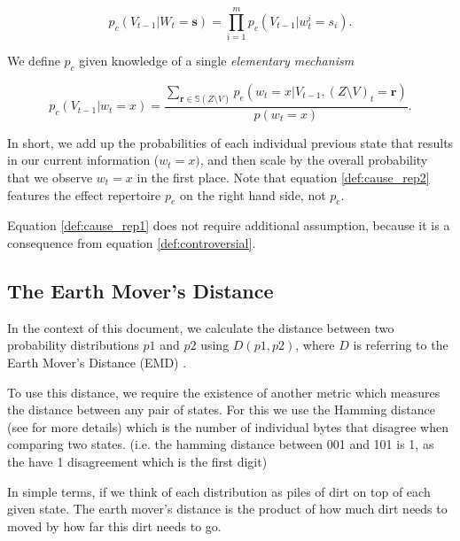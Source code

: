\begin{equation}
\label{def:cause_rep1}
p_c(V_{t-1} | W_t=\mathbf{s}) = \prod \limits_{i = 1}^{m} p_c(V_{t-1}|w^i_{t} = s_i).
\end{equation}

We define $p_c$ given knowledge of a single \textit{elementary mechanism}

\begin{equation}
\label{def:cause_rep2}
p_c(V_{t-1}| w_t = x) = \frac{\sum \limits_{\mathbf{r} \in \mathbb{S}(Z\setminus V)} p_e(w_t = x| V_{t-1}, (Z \setminus V)_t = \mathbf{r})}{p(w_t = x)}.
\end{equation}

In short, we add up the probabilities of each individual previous state that results in our current information ($w_t = x)$, and then scale by the overall probability that we observe $w_t = x$ in the first place. Note that equation \ref{def:cause_rep2} features the effect repertoire $p_e$ on the right hand side, not $p_c$.

\begin{remark}
	Equation \ref{def:cause_rep1} does not require additional assumption, because it is a consequence from equation \ref{def:controversial}.
\end{remark}



\subsection{The Earth Mover's Distance }
In the context of this document, we calculate the distance between two probability distributions $p1$ and $p2$ using $D(p1,p2)$, where $D$ is referring to the Earth Mover's Distance (EMD) \cite{rubner1998metric}.

To use this distance, we require the existence of another metric which measures the distance between any pair of states. For this we use the Hamming distance (see \cite{hill1986first} for more details) which is the number of individual bytes that disagree when comparing two states. (i.e. the hamming distance between 001 and 101 is 1, as the have 1 disagreement which is the first digit)

In simple terms, if we think of each distribution as piles of dirt on top of each given state. The earth mover's distance is the product of how much dirt needs to moved by how far this dirt needs to go. 


